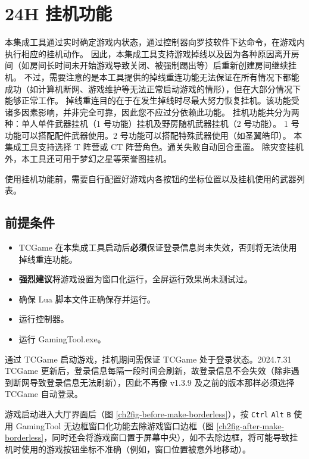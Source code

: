 \section{24H 挂机功能}

本集成工具通过实时确定游戏内状态，通过控制器向罗技软件下达命令，在游戏内执行相应的挂机动作。
因此，本集成工具支持游戏掉线以及因为各种原因离开房间（如房间长时间未开始游戏导致关闭、被强制踢出等）后重新创建房间继续挂机。
不过，需要注意的是本工具提供的掉线重连功能无法保证在所有情况下都能成功（如计算机断网、游戏维护等无法正常启动游戏的情形），但在大部分情况下能够正常工作。
掉线重连目的在于在发生掉线时尽最大努力恢复挂机。该功能受诸多因素影响，并非完全可靠，因此您不应过分依赖此功能。
挂机功能共分为两种：单人单件武器挂机（1 号功能）挂机及野房随机武器挂机（2 号功能）。
1 号功能可以搭配配件武器使用。2 号功能可以搭配特殊武器使用（如圣翼皓印）。
本集成工具支持选择 T 阵营或 CT 阵营角色。通关失败自动回合重置。
除灾变挂机外，本工具还可用于梦幻之星等荣誉图挂机。

使用挂机功能前，需要自行配置好游戏内各按钮的坐标位置以及挂机使用的武器列表。

\subsection{前提条件}

\begin{itemize}

\item TCGame 在本集成工具启动后\textbf{\color{red}必须}保证登录信息尚未失效，否则将无法使用掉线重连功能。

\item \textbf{\color{red}强烈建议}将游戏设置为窗口化运行，全屏运行效果尚未测试过。

\item 确保 Lua 脚本文件正确保存并运行。

\item 运行控制器。

\item 运行 GamingTool.exe。

\end{itemize}

通过 TCGame 启动游戏，挂机期间需保证 TCGame 处于登录状态。2024.7.31 TCGame 更新后，登录信息每隔一段时间会刷新，故登录信息不会失效（除非遇到断网导致登录信息无法刷新），因此不再像 v1.3.9 及之前的版本那样必须选择 TCGame 自动登录。

游戏启动进入大厅界面后（图 \ref{ch2fig-before-make-borderless}），按 \lstinline{Ctrl} \lstinline{Alt} \lstinline{B} 使用 GamingTool 无边框窗口化功能去除游戏窗口边框（图 \ref{ch2fig-after-make-borderless}，同时还会将游戏窗口置于屏幕中央），如不去除边框，将可能导致挂机时使用的游戏按钮坐标不准确（例如，窗口位置被意外地移动）。

